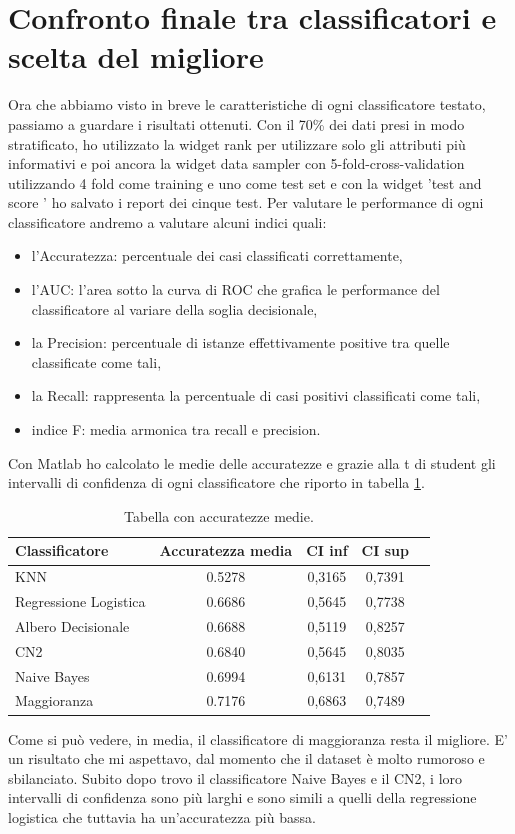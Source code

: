 \documentclass[a4paper, 12p]{report}
\begin{document}
\section{Confronto finale tra classificatori e scelta del migliore}
Ora che abbiamo visto in breve le caratteristiche di ogni classificatore testato, passiamo a guardare i risultati ottenuti. 
Con il 70\% dei dati presi in modo stratificato, ho utilizzato la widget rank per utilizzare solo gli attributi più informativi e poi ancora la widget data sampler con 5-fold-cross-validation utilizzando 4 fold come training e uno come test set e con la widget 'test and score ' ho salvato i report dei cinque test. 
Per valutare le performance di ogni classificatore andremo a valutare alcuni indici quali:
\begin{itemize}
\item l'Accuratezza: percentuale dei casi classificati correttamente,
\item l'AUC: l'area sotto la curva di ROC che grafica le performance del classificatore al variare della soglia decisionale, 
\item la Precision:  percentuale di istanze effettivamente positive tra quelle classificate come tali,
\item la Recall: rappresenta la percentuale di casi positivi classificati come tali,
\item indice F: media armonica tra recall e precision.
\end{itemize}
Con Matlab ho calcolato le medie delle accuratezze e grazie alla t di student gli intervalli di confidenza di ogni classificatore che riporto in tabella \ref{tab:1}.
\begin{table}
\caption{Tabella con accuratezze medie.}
\label{tab:1}
\begin{tabular}{|l|c|c|c|l|}
\hline
Classificatore & Accuratezza media & CI inf  & CI sup\\
\hline
KNN & 0.5278 & 0,3165 & 0,7391\\
\hline
Regressione Logistica & 0.6686 & 0,5645 & 0,7738\\
\hline
Albero Decisionale & 0.6688 & 0,5119 & 0,8257\\
\hline
CN2 & 0.6840 & 0,5645 & 0,8035\\
\hline
Naive Bayes & 0.6994 & 0,6131 & 0,7857\\
\hline
Maggioranza & 0.7176 & 0,6863 & 0,7489\\
\hline

\end{tabular}
\end{table}
Come si può vedere, in media, il classificatore di maggioranza resta il migliore. E' un risultato che mi aspettavo, dal momento che il dataset è molto rumoroso e sbilanciato. 
Subito dopo trovo il classificatore Naive Bayes e il CN2, i loro intervalli di confidenza sono più larghi e sono simili a quelli della regressione logistica che tuttavia ha un'accuratezza più bassa.
\end{document}
